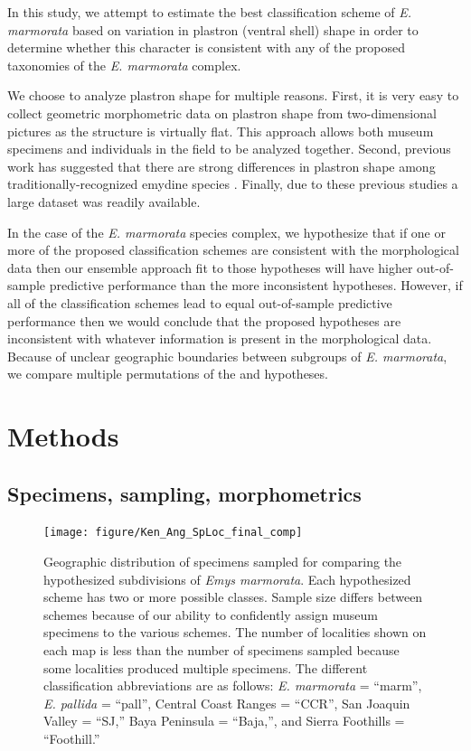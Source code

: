 \documentclass[fleqn,10pt,lineno]{wlpeerj} %
\begin{document}
In this study, we attempt to estimate the best classification scheme of \textit{E. marmorata} based on variation in plastron (ventral shell) shape in order to determine whether this character is consistent with any of the proposed taxonomies of the \textit{E. marmorata} complex. 

We choose to analyze plastron shape for multiple reasons. First, it is very easy to collect geometric morphometric data on plastron shape from two-dimensional pictures as the structure is virtually flat. This approach allows both museum specimens and individuals in the field to be analyzed together. Second, previous work has suggested that there are strong differences in plastron shape among traditionally-recognized emydine species \citep{Angielczyk2007,Angielczyk2011,Angielczyk2013a}. Finally, due to these previous studies a large dataset was readily available.

In the case of the \textit{E. marmorata} species complex, we hypothesize that if one or more of the proposed classification schemes are consistent with the morphological data then our ensemble approach fit to those hypotheses will have higher out-of-sample predictive performance than the more inconsistent hypotheses. However, if all of the classification schemes lead to equal out-of-sample predictive performance then we would conclude that the proposed hypotheses are inconsistent with whatever information is present in the morphological data. Because of unclear geographic boundaries between subgroups of \textit{E. marmorata}, we compare multiple permutations of the \citep{Spinks2010} and \citet{Spinks2014} hypotheses.


\section*{Methods}
\subsection*{Specimens, sampling, morphometrics}

\afterpage{\clearpage}
\begin{figure}[ht]
  \centering
  \texttt{[image: figure/Ken\_Ang\_SpLoc\_final\_comp]}
  \caption{Geographic distribution of specimens sampled for comparing the hypothesized subdivisions of \textit{Emys marmorata}. Each hypothesized scheme has two or more possible classes. Sample size differs between schemes because of our ability to confidently assign museum specimens to the various schemes. The number of localities shown on each map is less than the number of specimens sampled because some localities produced multiple specimens. The different classification abbreviations are as follows: \textit{E. marmorata} = ``marm'', \textit{E. pallida} = ``pall'', Central Coast Ranges = ``CCR'', San Joaquin Valley = ``SJ,'' Baya Peninsula = ``Baja,'', and Sierra Foothills = ``Foothill.''}
  \label{fig:map}
\end{figure}
\end{document}
